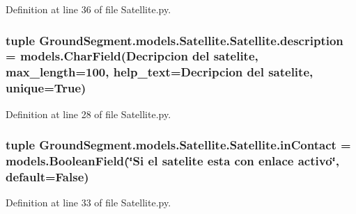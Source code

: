 Definition at line 36 of file Satellite.\+py.

\hypertarget{class_ground_segment_1_1models_1_1_satellite_1_1_satellite_a076215a5d0896cf97edbf312c7605000}{}
\subsubsection[{description}]{\setlength{\rightskip}{0pt plus 5cm}tuple Ground\+Segment.\+models.\+Satellite.\+Satellite.\+description = models.\+Char\+Field(\textquotesingle{}Decripcion del satelite\textquotesingle{}, max\+\_\+length=100, help\+\_\+text=\textquotesingle{}Decripcion del satelite\textquotesingle{}, unique=True)\hspace{0.3cm}{\ttfamily [static]}}\label{class_ground_segment_1_1models_1_1_satellite_1_1_satellite_a076215a5d0896cf97edbf312c7605000}


Definition at line 28 of file Satellite.\+py.

\hypertarget{class_ground_segment_1_1models_1_1_satellite_1_1_satellite_a5ee2ef851142b9b94e44d850425d62c1}{}
\subsubsection[{in\+Contact}]{\setlength{\rightskip}{0pt plus 5cm}tuple Ground\+Segment.\+models.\+Satellite.\+Satellite.\+in\+Contact = models.\+Boolean\+Field(\char`\"{}Si el satelite esta con enlace activo\char`\"{}, default=False)\hspace{0.3cm}{\ttfamily [static]}}\label{class_ground_segment_1_1models_1_1_satellite_1_1_satellite_a5ee2ef851142b9b94e44d850425d62c1}


Definition at line 33 of file Satellite.\+py.

\hypertarget{class_ground_segment_1_1models_1_1_satellite_1_1_satellite_a5bb0cfae504099155343019582b87213}{}
